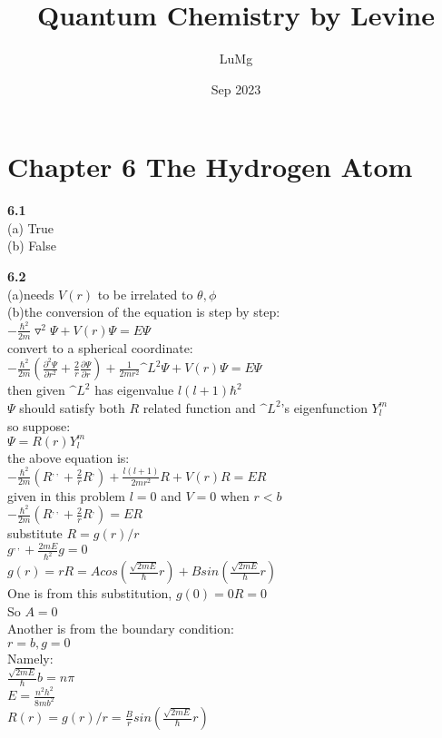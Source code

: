 \documentclass{article}
\title{Quantum Chemistry by Levine}
\author{LuMg}
\date{Sep 2023}
\begin{document}
\maketitle

\section{Chapter 6 The Hydrogen Atom}
\textbf{6.1}\\
(a) True\\
(b) False\\
\newline

\textbf{6.2}\\
(a)needs $V(r)$ to be irrelated to $\theta, \phi$\\
(b)the conversion of the equation is step by step:\\
$-\frac{\hbar^2}{2m}\triangledown^2\Psi + V(r)\Psi = E\Psi$\\
convert to a spherical coordinate:\\
$-\frac{\hbar^2}{2m}(\frac{\partial^2\Psi}{\partial r^2}+\frac{2}{r}\frac{\partial \Psi}{\partial r})+\frac{1}{2mr^2}\^{L}^2\Psi+V(r)\Psi = E\Psi$\\
then given $\^{L}^2$ has eigenvalue $l(l+1)\hbar^2$\\
$\Psi$ should satisfy both $R$ related function and $\^{L}^2$'s eigenfunction $Y^m_l$\\
so suppose:\\
$\Psi = R(r)Y^m_l$\\
the above equation is:\\
$-\frac{\hbar^2}{2m}(R^{,,}+\frac{2}{r}R^,)+\frac{l(l+1)}{2mr^2}R+V(r)R = ER$\\
given in this problem $l = 0$ and $V = 0$ when $r<b$\\
$-\frac{\hbar^2}{2m}(R^{,,}+\frac{2}{r}R^,) = ER$\\
substitute $R = g(r)/r$\\
$g^{,,}+\frac{2mE}{\hbar^2}g = 0$\\
$g(r) = rR = Acos(\frac{\sqrt{2mE}}{\hbar}r) + Bsin(\frac{\sqrt{2mE}}{\hbar}r)$\\
One is from this substitution, $g(0) = 0R = 0$\\
So $A = 0$\\
Another is from the boundary condition:\\
$r = b, g = 0$\\
Namely:\\
$\frac{\sqrt{2mE}}{\hbar}b = n\pi$\\
$E = \frac{n^2h^2}{8mb^2}$\\
$R(r) = g(r)/r = \frac{B}{r}sin(\frac{\sqrt{2mE}}{\hbar}r)$\\
\newline
\end{document}
